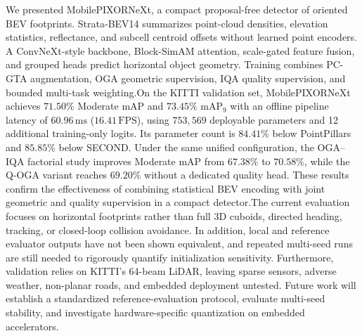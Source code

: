 We presented MobilePIXORNeXt, a compact proposal-free detector of oriented BEV footprints. Strata-BEV14 summarizes point-cloud densities, elevation statistics, reflectance, and subcell centroid offsets without learned point encoders. A ConvNeXt-style backbone, Block-SimAM attention, scale-gated feature fusion, and grouped heads predict horizontal object geometry. Training combines PC-GTA augmentation, OGA geometric supervision, IQA quality supervision, and bounded multi-task weighting.On the KITTI validation set, MobilePIXORNeXt achieves $71.50\%$ Moderate mAP and $73.45\%$ $\text{mAP}_9$ with an offline pipeline latency of $60.96\,\text{ms}$ ($16.41\,\text{FPS}$), using $753{,}569$ deployable parameters and 12 additional training-only logits. Its parameter count is $84.41\%$ below PointPillars and $85.85\%$ below SECOND. Under the same unified configuration, the OGA--IQA factorial study improves Moderate mAP from $67.38\%$ to $70.58\%$, while the Q-OGA variant reaches $69.20\%$ without a dedicated quality head. These results confirm the effectiveness of combining statistical BEV encoding with joint geometric and quality supervision in a compact detector.The current evaluation focuses on horizontal footprints rather than full 3D cuboids, directed heading, tracking, or closed-loop collision avoidance. In addition, local and reference evaluator outputs have not been shown equivalent, and repeated multi-seed runs are still needed to rigorously quantify initialization sensitivity. Furthermore, validation relies on KITTI's 64-beam LiDAR, leaving sparse sensors, adverse weather, non-planar roads, and embedded deployment untested. Future work will establish a standardized reference-evaluation protocol, evaluate multi-seed stability, and investigate hardware-specific quantization on embedded accelerators.